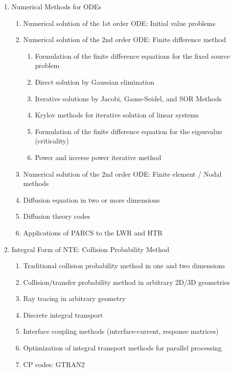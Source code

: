 \documentclass[12pt]{article}
\begin{document}
\begin{enumerate}
\item Numerical Methods for ODEs
  \begin{enumerate}
  \item Numerical solution of the 1st order ODE: Initial value problems
  \item Numerical solution of the 2nd order ODE: Finite difference method
    \begin{enumerate}
    \item Formulation of the finite difference equations for the fixed source problem
    \item Direct solution by Gaussian elimination
    \item Iterative solutions by Jacobi, Gauss-Seidel, and SOR Methods
    \item Krylov methods for iterative solution of linear systems
    \item Formulation of the finite difference equation for the eigenvalue (criticality)
    \item Power and inverse power iterative method
    \end{enumerate}
  \item Numerical solution of the 2nd order ODE: Finite element / Nodal methods
  \item Diffusion equation in two or more dimensions
  \item Diffusion theory codes
  \item Applications of PARCS to the LWR and HTR
  \end{enumerate}

\item Integral Form of NTE: Collision Probability Method
  \begin{enumerate}
  \item Traditional collision probability method in one and two dimensions
  \item Collision/transfer probability method in arbitrary 2D/3D geometries
  \item Ray tracing in arbitrary geometry
  \item Discrete integral transport
  \item Interface coupling methods (interface-current, response matrices)
  \item Optimization of integral transport methods for parallel processing
  \item CP codes: GTRAN2
  \end{enumerate}


\end{enumerate}
\end{document}
